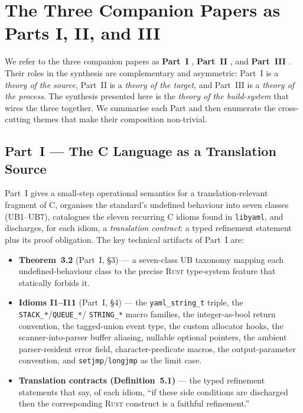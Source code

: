 \documentclass[12pt]{article}
\theoremstyle{definition}
\theoremstyle{remark}
\newcommand{\rust}{\textnormal{\textsc{Rust}}}
\newcommand{\clang}{\textnormal{\textsc{C}}}
\newcommand{\libyaml}{\texttt{libyaml}}
\begin{document}
\section{The Three Companion Papers as Parts I, II, and III}
\label{sec:partsoverview}

We refer to the three companion papers as \textbf{Part~I}
\cite{long-c}, \textbf{Part~II} \cite{long-rust}, and \textbf{Part~III}
\cite{long-transpile}. Their roles in the synthesis are complementary
and asymmetric: Part~I is a \emph{theory of the source}, Part~II is a
\emph{theory of the target}, and Part~III is a \emph{theory of the
process}. The synthesis presented here is the \emph{theory of the
build-system} that wires the three together. We summarise each Part and
then enumerate the cross-cutting themes that make their composition
non-trivial.

\subsection{Part~I --- The C Language as a Translation Source}

Part~I gives a small-step operational semantics for a translation-relevant
fragment of C, organises the standard's undefined behaviour into seven
classes (UB1--UB7), catalogues the eleven recurring \clang{} idioms found
in \libyaml{}, and discharges, for each idiom, a \emph{translation
contract}: a typed refinement statement plus its proof obligation. The
key technical artifacts of Part~I are:

\begin{itemize}
\item \textbf{Theorem~3.2} (Part~I, \S{}3) --- a seven-class UB
taxonomy mapping each undefined-behaviour class to the precise \rust{}
type-system feature that statically forbids it.
\item \textbf{Idioms I1--I11} (Part~I, \S{}4) --- the
\texttt{yaml\_string\_t} triple, the \texttt{STACK\_*}/\texttt{QUEUE\_*}/
\texttt{STRING\_*} macro families, the integer-as-bool return
convention, the tagged-union event type, the custom allocator hooks,
the scanner-into-parser buffer aliasing, nullable optional pointers, the
ambient parser-resident error field, character-predicate macros, the
output-parameter convention, and \texttt{setjmp}/\texttt{longjmp} as the
limit case.
\item \textbf{Translation contracts (Definition~5.1)} --- the typed
refinement statements that say, of each idiom, ``if these side
conditions are discharged then the corresponding \rust{} construct is a
faithful refinement.''
\end{itemize}
\end{document}
